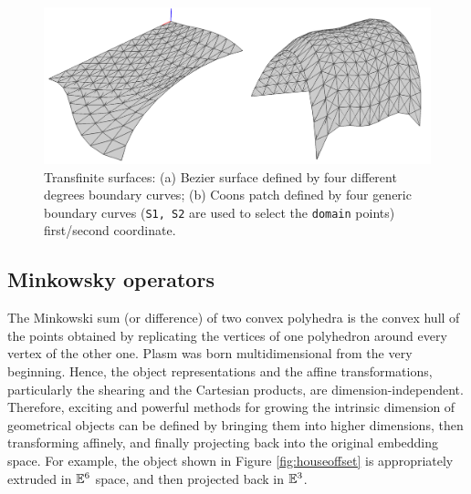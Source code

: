 \documentclass{juliacon}
\begin{document}
\begin{figure}[htbp] %
	\includegraphics[width=\linewidth]{figs/transfinite}
	\caption{Transfinite surfaces: (a) Bezier surface defined by four different degrees boundary curves; (b) Coons patch defined by four generic boundary curves ({\tt S1, S2} are used to select the {\tt domain} points) first/second coordinate.}
	\label{fig:5:3:transfinite}
\end{figure}


\subsection{Minkowsky operators}
\label{subsec:title_auth}

The  Minkowski sum (or difference) of two convex polyhedra is the convex hull of the points obtained by replicating the vertices of one polyhedron around every vertex of the other one.
Plasm was born multidimensional from the very beginning. Hence, the object representations and the affine transformations, particularly the shearing and the Cartesian products, are dimension-independent. Therefore, exciting and powerful methods for growing the intrinsic dimension of geometrical objects can be defined by bringing them into higher dimensions, then transforming affinely, and finally projecting back into the original embedding space. For example, the object shown in Figure \ref{fig:houseoffset} is appropriately extruded in $\mathbb{E}^6$ space, and then projected back in $\mathbb{E}^3$. 
\end{document}
